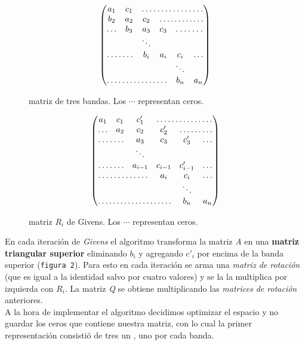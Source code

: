 \documentclass[a4paper]{article}
\begin{document}
\begin{multicols}{2}
\begin{figure}[H]
$$
 \begin{pmatrix}
   a_1 & c_1 & \hdotsfor{4} \\
   b_2 & a_2 &  c_2 & \hdotsfor{3} \\
  \hdots & b_3 & a_3 & c_3 & \hdotsfor{2} \\
   & & \ddots \\
   \hdotsfor{2} & b_i & a_i & c_i & \hdots \\
   & & & & \ddots \\
   \hdotsfor{4} & b_n & a_n \\
 \end{pmatrix}
$$
 \caption{matriz de tres bandas. Los $\cdots$ representan ceros.}
\end{figure}

\begin{figure}[H]
$$
 \begin{pmatrix}
   a_1 & c_1 & c'_1 & \hdotsfor{3} \\
   \hdots & a_2 &  c_2 & c'_2 &\hdotsfor{2} \\
   \hdotsfor{2} & a_3 & c_3 & c'_3 & \hdots \\
   & & \ddots \\
   \hdotsfor{2} & a_{i - 1} & c_{i - 1} & c'_{i - 1} & \hdots \\
   \hdotsfor{3} & a_i & c_i & \hdots \\
   & & & & \ddots \\
   \hdotsfor{4} & b_n & a_n \\
 \end{pmatrix}
$$
 \caption{matriz $R_i$ de Givens. Los $\cdots$ representan ceros.}
\end{figure}
\end{multicols}

En cada iteración de \textit{Givens} el algoritmo transforma la matriz \textit{A} en una \textbf{matriz triangular superior} eliminando $b_i$ y agregando $c'_i$ por encima de la banda superior (\texttt{figura 2}). Para esto en cada iteración se arma una \textit{matriz de rotación} (que es igual a la identidad salvo por cuatro valores) y se la la multiplica por izquierda con $R_i$. La matriz \textit{Q} se obtiene multiplicando las \textit{matrices de rotación} anteriores.\\

A la hora de implementar el algoritmo decidimos optimizar el espacio y no guardar los ceros que contiene nuestra matriz, con lo cual la primer representación consistió de tres un , uno por cada banda. 
\end{document}
